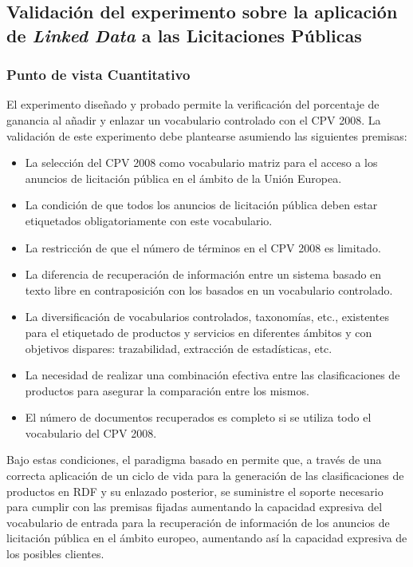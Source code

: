 \clearpage
\subsection{Validación del experimento sobre la aplicación de \textit{Linked Data} a las Licitaciones Públicas}\label{sect:validation-tablas}


\subsubsection{Punto de vista Cuantitativo}\label{sect:experimento-pscs-validation}
El experimento diseñado y probado permite la verificación del porcentaje de ganancia al añadir y enlazar un vocabulario 
controlado con el \gls{CPV} 2008. La validación de este experimento debe plantearse asumiendo las siguientes premisas:
\begin{itemize}
 \item La selección del CPV 2008 como vocabulario matriz para el acceso a los anuncios de licitación pública 
en el ámbito de la Unión \gls{Europea}.
\item La condición de que todos los anuncios de licitación pública deben estar etiquetados obligatoriamente con 
este vocabulario.
\item La restricción de que el número de términos en el CPV 2008 es limitado.
\item La diferencia de recuperación de información entre un sistema basado en texto libre en contraposición con los 
basados en un vocabulario controlado.
\item La diversificación de vocabularios controlados, taxonomías, etc., existentes para el etiquetado de productos 
y servicios en diferentes ámbitos y con objetivos dispares: trazabilidad, extracción de estadísticas, etc.
\item La necesidad de realizar una combinación efectiva entre las clasificaciones de productos para asegurar
la comparación entre los mismos.
\item El número de documentos recuperados es completo si se utiliza todo el vocabulario del CPV 2008.
\end{itemize}

Bajo estas condiciones, el paradigma basado en \linkeddata permite que, a través de una correcta aplicación 
de un ciclo de vida para la generación de las clasificaciones de productos en \gls{RDF} y su enlazado posterior, 
se suministre el soporte necesario para cumplir con las premisas fijadas aumentando la capacidad expresiva 
del vocabulario de entrada para la recuperación de información de los anuncios de licitación pública en el 
ámbito europeo, aumentando así la capacidad expresiva de los posibles clientes.

